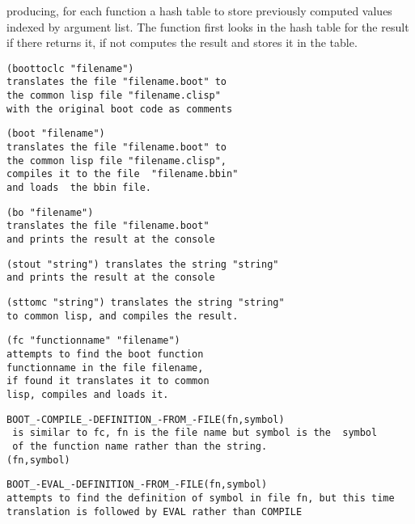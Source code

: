 \documentclass{article}
\begin{document}
producing, for each function a
hash table to store previously computed values indexed by argument
list.  The function first looks in the hash table for the result
if there returns it, if not computes the result and stores it in the
table.
 
\begin{verbatim}  
(boottoclc "filename")
translates the file "filename.boot" to
the common lisp file "filename.clisp" 
with the original boot code as comments
\end{verbatim} 
 
\begin{verbatim} 
(boot "filename")
translates the file "filename.boot" to
the common lisp file "filename.clisp", 
compiles it to the file  "filename.bbin" 
and loads  the bbin file.
\end{verbatim} 

\begin{verbatim} 
(bo "filename")
translates the file "filename.boot"
and prints the result at the console
\end{verbatim} 

\begin{verbatim} 
(stout "string") translates the string "string"  
and prints the result at the console
\end{verbatim} 
 
\begin{verbatim} 
(sttomc "string") translates the string "string"  
to common lisp, and compiles the result.
\end{verbatim} 
 
\begin{verbatim} 
(fc "functionname" "filename")
attempts to find the boot function
functionname in the file filename, 
if found it translates it to common
lisp, compiles and loads it.
\end{verbatim} 
 
\begin{verbatim} 
BOOT_-COMPILE_-DEFINITION_-FROM_-FILE(fn,symbol)
 is similar to fc, fn is the file name but symbol is the  symbol
 of the function name rather than the string.
(fn,symbol)
\end{verbatim} 
 
\begin{verbatim} 
BOOT_-EVAL_-DEFINITION_-FROM_-FILE(fn,symbol)
attempts to find the definition of symbol in file fn, but this time
translation is followed by EVAL rather than COMPILE
\end{verbatim} 
 
\end{document}
